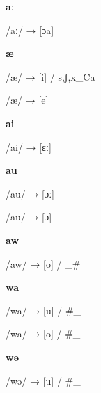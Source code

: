 \begin{center}\textbf{aː}\end{center}
\begin{multicols}{4}
\noindent /aː/ → [ɔa]

\end{multicols}

\begin{center}\textbf{æ}\end{center}
\begin{multicols}{4}
\noindent /æ/ → [i] / {s,ʃ,x}\_Ca

\noindent /æ/ → [e]

\end{multicols}

\begin{center}\textbf{ai}\end{center}
\begin{multicols}{4}
\noindent /ai/ → [ɛː]

\end{multicols}

\begin{center}\textbf{au}\end{center}
\begin{multicols}{4}
\noindent /au/ → [ɔː]

\noindent /au/ → [ɔ]

\end{multicols}

\begin{center}\textbf{aw}\end{center}
\begin{multicols}{4}
\noindent /aw/ → [o] / \_\#

\end{multicols}

\begin{center}\textbf{wa}\end{center}
\begin{multicols}{4}
\noindent /wa/ → [u] / \#\_

\noindent /wa/ → [o] / \#\_

\end{multicols}

\begin{center}\textbf{wə}\end{center}
\begin{multicols}{4}
\noindent /wə/ → [u] / \#\_

\end{multicols}


